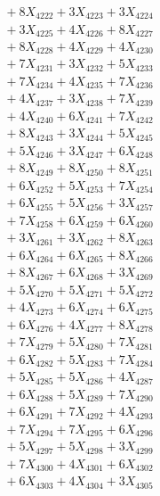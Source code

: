 \documentclass[a4paper,10pt]{article}
\begin{document}
{\begin{align}
&\;  + 8 X_{4222} + 3 X_{4223} + 3 X_{4224} \\[0.3ex]
&\;  + 3 X_{4225} + 4 X_{4226} + 8 X_{4227} \\[0.3ex]
&\;  + 8 X_{4228} + 4 X_{4229} + 4 X_{4230} \\[0.3ex]
&\;  + 7 X_{4231} + 3 X_{4232} + 5 X_{4233} \\[0.3ex]
&\;  + 7 X_{4234} + 4 X_{4235} + 7 X_{4236} \\[0.3ex]
&\;  + 4 X_{4237} + 3 X_{4238} + 7 X_{4239} \\[0.5ex]\allowbreak
&\;  + 4 X_{4240} + 6 X_{4241} + 7 X_{4242} \\[0.3ex]
&\;  + 8 X_{4243} + 3 X_{4244} + 5 X_{4245} \\[0.3ex]
&\;  + 5 X_{4246} + 3 X_{4247} + 6 X_{4248} \\[0.3ex]
&\;  + 8 X_{4249} + 8 X_{4250} + 8 X_{4251} \\[0.3ex]
&\;  + 6 X_{4252} + 5 X_{4253} + 7 X_{4254} \\[0.3ex]
&\;  + 6 X_{4255} + 5 X_{4256} + 3 X_{4257} \\[0.3ex]
&\;  + 7 X_{4258} + 6 X_{4259} + 6 X_{4260} \\[0.3ex]
&\;  + 3 X_{4261} + 3 X_{4262} + 8 X_{4263} \\[0.3ex]
&\;  + 6 X_{4264} + 6 X_{4265} + 8 X_{4266} \\[0.3ex]
&\;  + 8 X_{4267} + 6 X_{4268} + 3 X_{4269} \\[0.5ex]\allowbreak
&\;  + 5 X_{4270} + 5 X_{4271} + 5 X_{4272} \\[0.3ex]
&\;  + 4 X_{4273} + 6 X_{4274} + 6 X_{4275} \\[0.3ex]
&\;  + 6 X_{4276} + 4 X_{4277} + 8 X_{4278} \\[0.3ex]
&\;  + 7 X_{4279} + 5 X_{4280} + 7 X_{4281} \\[0.3ex]
&\;  + 6 X_{4282} + 5 X_{4283} + 7 X_{4284} \\[0.3ex]
&\;  + 5 X_{4285} + 5 X_{4286} + 4 X_{4287} \\[0.3ex]
&\;  + 6 X_{4288} + 5 X_{4289} + 7 X_{4290} \\[0.3ex]
&\;  + 6 X_{4291} + 7 X_{4292} + 4 X_{4293} \\[0.3ex]
&\;  + 7 X_{4294} + 7 X_{4295} + 6 X_{4296} \\[0.3ex]
&\;  + 5 X_{4297} + 5 X_{4298} + 3 X_{4299} \\[0.5ex]\allowbreak
&\;  + 7 X_{4300} + 4 X_{4301} + 6 X_{4302} \\[0.3ex]
&\;  + 6 X_{4303} + 4 X_{4304} + 3 X_{4305} \\[0.3ex]

\end{align}}
\end{document}
